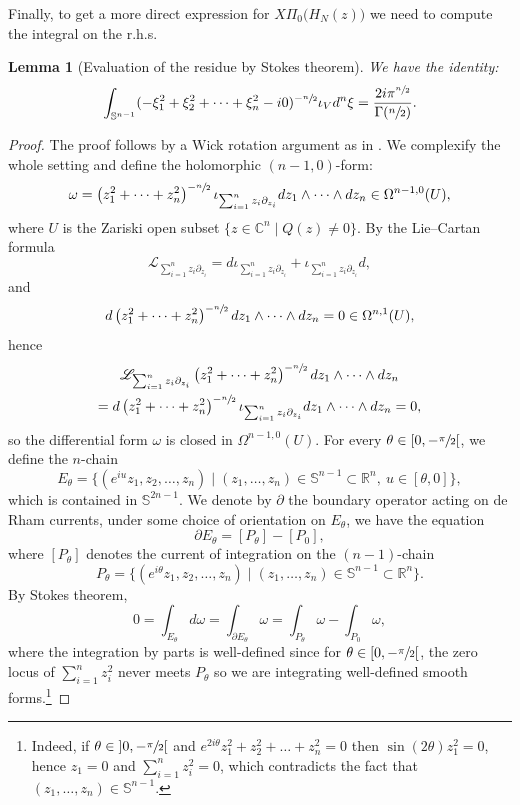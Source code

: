 \documentclass[10pt]{amsart}
\let\pazocal\mathscr
\newtheorem{lemma}[theorem]{Lemma}
\theoremstyle{definition}
\let\st\mid
\let\euler X
\let\Feuler V
\newcommand{\open}[1]{\mathopen{}\mathclose{\left]#1 \right[}}
\newcommand{\clopen}[1]{\mathopen{}\mathclose{\left[#1 \right[}}
\begin{document}
Finally, to get a more direct expression for $\euler\Pi_0 \big(H_N(z)\big)$ we need to compute the integral on the r.h.s.

\begin{lemma}[Evaluation of the residue by Stokes theorem] \label{lem:Stokes}
We have the identity:
\begin{equation}\label{restokes}
\int_{\mathbb{S}^{n-1}}
(-\xi_1^2+\xi_2^2+\dots+\xi_n^2 -i0)^{-\sfrac{n}{2}} \iota_\Feuler d^n\xi=\frac{2i\pi^{\sfrac{n}{2}}}{\Gamma(\sfrac{n}{2})}.
\end{equation}
\end{lemma}
\begin{proof}
The proof follows by a Wick rotation argument as in \cite[\S8.3]{Dang2020}.
We complexify the whole setting and
define the holomorphic $(n-1,0)$-form:
\[
\omega=\left(z_1^2+\dots+z_n^2\right)^{-\sfrac{n}{2}}\iota_{\sum_{i=1}^n z_i\partial_{z_i}} dz_1\wedge \dots\wedge dz_n \in \Omega^{n-1,0}(U),
\]
where $U$ is the Zariski open subset $\{z\in \mathbb{C}^n \st Q(z)\neq 0 \}$. By the Lie--Cartan formula
\[
\pazocal{L}_{\sum_{i=1}^n z_i\partial_{z_i}} =d \iota_{\sum_{i=1}^n z_i\partial_{z_i}}+\iota_{\sum_{i=1}^n z_i\partial_{z_i}}d,
\]
and
\[
d \left(z_1^2+\dots+z_n^2\right)^{-\sfrac{n}{2}} dz_1\wedge \dots\wedge dz_n=0 \in\Omega^{n,1}(U),
\]
hence
\begin{multline*}
\pazocal{L}_{\sum_{i=1}^n z_i\partial_{z_i}} \left(z_1^2+\dots+z_n^2\right)^{-\sfrac{n}{2}} dz_1\wedge \dots\wedge dz_n \\
= d\left(z_1^2+\dots+z_n^2\right)^{-\sfrac{n}{2}}\iota_{\sum_{i=1}^n z_i\partial_{z_i}} dz_1\wedge \dots\wedge dz_n=0,
\end{multline*}
so the differential form $\omega$ is closed in $\Omega^{n-1,0}(U)$.
For every $\theta\in \clopen{0,-\sfrac{\pi}{2}}$,
we define the $n$-chain
\[
E_\theta=\{(e^{iu}z_1,z_2,\dots,z_n) \st (z_1,\dots,z_n)\in \mathbb{S}^{n-1}\subset\mathbb{R}^n, \ u\in [\theta,0] \},
\]
which is contained in $\mathbb{S}^{2n-1}$.
We denote by $\partial$ the boundary operator acting on de Rham currents, under some choice of orientation on $E_\theta$, we have the equation
\[
\partial E_\theta=[P_\theta ] -[P_0],
\]
where $[P_\theta]$ denotes the current of integration on the $(n-1)$-chain
\[
P_\theta=\{(e^{i\theta}z_1,z_2,\dots,z_n) \st (z_1,\dots,z_n)\in \mathbb{S}^{n-1}\subset \mathbb{R}^n\}.
\]
By Stokes theorem,
\[
0= \int_{E_\theta} d\omega =\int_{\partial E_\theta } \omega=\int_{P_\theta} \omega-\int_{P_0}\omega,
\]
where the integration by parts is well-defined
since for $\theta\in \clopen{0,-\sfrac{\pi}{2}}$, the zero locus of
$ \sum_{i=1}^nz_i^2$ never meets $P_\theta$ so we are integrating well-defined smooth forms.\footnote{Indeed, if $\theta\in \open{0,-\sfrac{\pi}{2}}$ and $e^{2i\theta}z_1^2+z_2^2+\dots+z_n^2=0$ then $\sin(2\theta)z_1^2=0$, hence $z_1=0$ and $\sum_{i=1}^n z_i^2=0$, which contradicts the fact that $(z_1,\dots,z_n)\in \mathbb{S}^{n-1}$.}


\end{proof}
\end{document}
